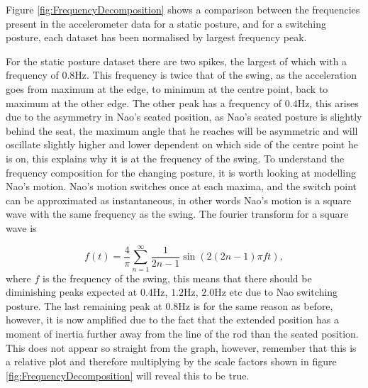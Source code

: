 \documentclass[11pt]{article}
\begin{document}
Figure \ref{fig:FrequencyDecomposition} shows a comparison between the frequencies present in the accelerometer data for a static posture, and for a switching posture, each dataset has been normalised by largest frequency peak. 

For the static posture dataset there are two spikes, the largest of which with a frequency of $0.8$Hz. This frequency is twice that of the swing, as the acceleration goes from maximum at the edge, to minimum at the centre point, back to maximum at the other edge. The other peak has a frequency of $0.4$Hz, this arises due to the asymmetry in Nao's seated position, as Nao's seated posture is slightly behind the seat, the maximum angle that he reaches will be asymmetric and will oscillate slightly higher and lower dependent on which side of the centre point he is on, this explains why it is at the frequency of the swing. To understand the frequency composition for the changing posture, it is worth looking at modelling Nao's motion. Nao's motion switches once at each maxima, and the switch point can be approximated as instantaneous, in other words Nao's motion is a square wave with the same frequency as the swing. The fourier transform for a square wave is

\begin{equation}
    f(t) = \frac{4}{\pi}\sum_{n=1}^{\infty} \frac{1}{2n-1}\sin(2(2n-1)\pi ft),
\end{equation}
where $f$ is the frequency of the swing, this means that there should be diminishing peaks expected at $0.4$Hz, $1.2$Hz, $2.0$Hz etc due to Nao switching posture. The last remaining peak at $0.8$Hz is for the same reason as before, however, it is now amplified due to the fact that the extended position has a moment of inertia further away from the line of the rod than the seated position. This does not appear so straight from the graph, however, remember that this is a relative plot and therefore multiplying by the scale factors shown in figure \ref{fig:FrequencyDecomposition} will reveal this to be true.\\
\end{document}
